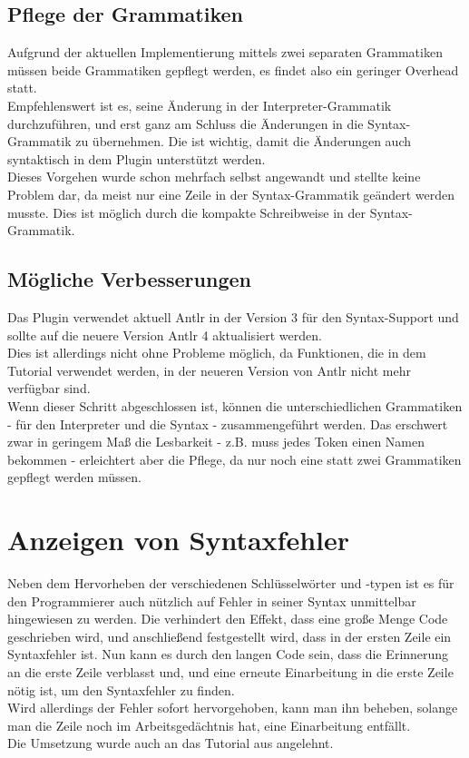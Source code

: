 \subsection{Pflege der Grammatiken}
Aufgrund der aktuellen Implementierung mittels zwei separaten Grammatiken müssen beide Grammatiken gepflegt werden, es findet also ein geringer Overhead statt.\\
Empfehlenswert ist es, seine Änderung in der Interpreter-Grammatik durchzuführen, und erst ganz am Schluss die Änderungen in die Syntax-Grammatik zu übernehmen. Die ist wichtig, damit die Änderungen auch syntaktisch in dem Plugin unterstützt werden.\\
Dieses Vorgehen wurde schon mehrfach selbst angewandt und stellte keine Problem dar, da meist nur eine Zeile in der Syntax-Grammatik geändert werden musste. Dies ist möglich durch die kompakte Schreibweise in der Syntax-Grammatik.

\subsection{Mögliche Verbesserungen}
Das Plugin verwendet aktuell Antlr in der Version 3 für den Syntax-Support und sollte auf die neuere Version Antlr 4 aktualisiert werden.\\
Dies ist allerdings nicht ohne Probleme möglich, da Funktionen, die in dem Tutorial \cite{netbeansSyntax} verwendet werden, in der neueren Version von Antlr nicht mehr verfügbar sind.\\
Wenn dieser Schritt abgeschlossen ist, können die unterschiedlichen Grammatiken - für den Interpreter und die Syntax - zusammengeführt werden.
Das erschwert zwar in geringem Maß die Lesbarkeit - z.B. muss jedes Token einen Namen bekommen - erleichtert aber die Pflege, da nur noch eine statt zwei Grammatiken gepflegt werden müssen.

\section{Anzeigen von Syntaxfehler}
Neben dem Hervorheben der verschiedenen Schlüsselwörter und -typen ist es für den Programmierer auch nützlich auf Fehler in seiner Syntax unmittelbar hingewiesen zu werden.
Die verhindert den Effekt, dass eine große Menge Code geschrieben wird, und anschließend festgestellt wird, dass in der ersten Zeile ein Syntaxfehler ist.
Nun kann es durch den langen Code sein, dass die Erinnerung an die erste Zeile verblasst und, und eine erneute Einarbeitung in die erste Zeile nötig ist, um den Syntaxfehler zu finden.\\
Wird allerdings der Fehler sofort hervorgehoben, kann man ihn beheben, solange man die Zeile noch im Arbeitsgedächtnis hat, eine Einarbeitung entfällt.\\
Die Umsetzung wurde auch an das Tutorial aus \cite{netbeansSyntax} angelehnt.


